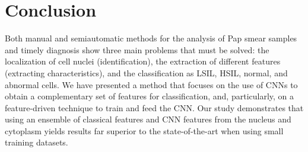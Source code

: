 \documentclass{bmcart}
\begin{document}
\section*{Conclusion}
Both manual and semiautomatic methods for the analysis of Pap smear samples and timely diagnosis show three main problems that must be solved: the localization of cell nuclei (identification), the extraction of different features (extracting characteristics), and the classification as LSIL, HSIL, normal, and abnormal cells. We have presented a method that focuses on the use of CNNs to obtain a complementary set of features for classification, and, particularly, on a feature-driven technique to train and feed the CNN. Our study demonstrates that using an ensemble of classical features and CNN features from the nucleus and cytoplasm yields results far superior to the state-of-the-art when using small training datasets.   
 
 
\end{document}
